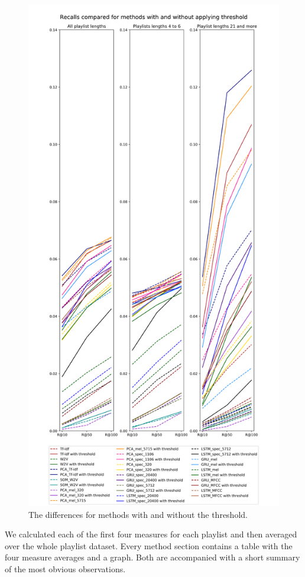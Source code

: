 \begin{figure}
    \centering
	\includegraphics[width=120mm]{./img/threshold_comparison.png}
	\caption{The differences for methods with and without the threshold.}
	\label{fig:method_comparison}
\end{figure}
    

We calculated each of the first four measures for each playlist and then averaged over the whole playlist dataset. Every method section contains a table with the four measure averages and a graph. Both are accompanied with a short summary of the most obvious observations.

